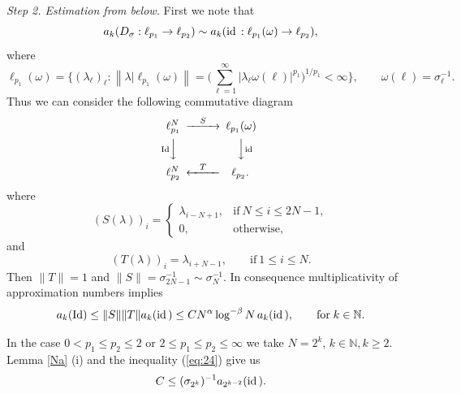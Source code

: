 \documentclass[12pt]{article}
\def\id{\mathop{\rm id \,}\nolimits}
\def\Id{\mathop{\rm Id}\nolimits}
\newcommand{\N}{{\mathbb N}}
\begin{document}
{\em Step 2. Estimation from below.} 
First we note that
\begin{displaymath}
	a_{k}(D_\sigma:\ell_{p_1}\rightarrow \ell_{p_2})\sim a_{k}(\id:\ell_{p_1}(\omega)\rightarrow \ell_{p_2}),
\end{displaymath}
where
\begin{displaymath}
	\ell_{p_1}(\omega)=\bigl\{(\lambda_\ell)_\ell: \left\|\lambda|\ell_{p_{1}}(\omega)\right\|=\bigl(\sum_{\ell=1}^{\infty}|
	\lambda_\ell \omega(\ell)
	|^{p_1}\bigr)^{1/p_1}<\infty\bigr\},\qquad \omega(\ell)=\sigma_\ell^{-1}.
\end{displaymath}
Thus we can consider  the following commutative diagram
\begin{equation}\nonumber
	\begin{CD}
		\ell_{p_1}^N@>{S}>>\ell_{p_1}(\omega)\\
		@V{\Id}VV@VV{\id}V\\
		\ell_{p_2}^N @<{T}<<\ell_{p_2}.\,
	\end{CD}
\end{equation}
where 
\begin{displaymath}
	(S(\lambda))_i=\left\{ \begin{array}{ll} \lambda_{i-N+1}, &{\mathrm{if}\ N\leq i\le 2N-1},\\ 0, &{\mathrm{otherwise,}}\end{array}\right.
\end{displaymath}
and
\begin{displaymath} 
	(T(\lambda))_i=\lambda_{i+N-1},\qquad\mathrm{if}\ 1\leq i\leq N.
\end{displaymath}
Then  $\|T\|=1$ and $ \|S\|= \sigma_{2N-1}^{-1}\sim \sigma_{N}^{-1} $. In consequence   multiplicativity of approximation numbers implies  %
\begin{equation}\label{eq:24}
		a_k(\Id)\leq\|S\|\|T\|a_k(\id)\le  C N^\alpha\log^{-\beta}N \, a_k(\id), \qquad\mathrm{for}\; k\in\N.	
\end{equation}


In the case  $0<p_1\leq p_2\leq2$ or  $2\leq p_1\leq p_2\leq\infty$ we take $N=2^k$, $k\in\N, k\geq 2$.  Lemma \ref{Na} (i) and the inequality (\ref{eq:24})   give us 
\begin{equation}
	C\leq (\sigma_{2^k})^{-1} a_{2^{k-2}}(\id).
	\label{eq:25}
\end{equation}
\end{document}
